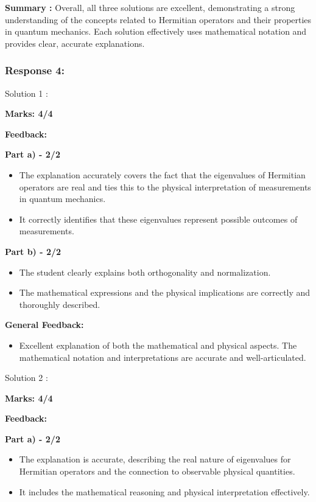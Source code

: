 \documentclass[a4paper,11pt]{article}
\begin{document}
\textbf{Summary :}
Overall, all three solutions are excellent, demonstrating a strong understanding of the concepts related to Hermitian operators and their properties in quantum mechanics. Each solution effectively uses mathematical notation and provides clear, accurate explanations.


\subsubsection*{Response 4:}

Solution 1 :

\textbf{Marks: 4/4}

\textbf{Feedback:}

\textbf{Part a) - 2/2}

\begin{itemize}
    \item The explanation accurately covers the fact that the eigenvalues of Hermitian operators are real and ties this to the physical interpretation of measurements in quantum mechanics.
    \item It correctly identifies that these eigenvalues represent possible outcomes of measurements.
\end{itemize}

\textbf{Part b) - 2/2}

\begin{itemize}
    \item The student clearly explains both orthogonality and normalization.
    \item The mathematical expressions and the physical implications are correctly and thoroughly described.
\end{itemize}

\textbf{General Feedback:}

\begin{itemize}
    \item Excellent explanation of both the mathematical and physical aspects. The mathematical notation and interpretations are accurate and well-articulated.
\end{itemize}


Solution 2 :

\textbf{Marks: 4/4}

\textbf{Feedback:}

\textbf{Part a) - 2/2}

\begin{itemize}
    \item The explanation is accurate, describing the real nature of eigenvalues for Hermitian operators and the connection to observable physical quantities.
    \item It includes the mathematical reasoning and physical interpretation effectively.
\end{itemize}
\end{document}
